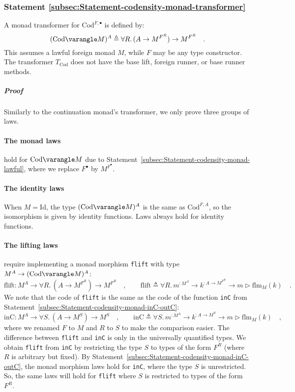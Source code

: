 \subsubsection{Statement \label{subsec:Statement-codensity-monad-transformer}\ref{subsec:Statement-codensity-monad-transformer}}

A monad transformer for $\text{Cod}^{F,\bullet}$ is defined by:
\[
(\text{Cod}\varangle M)^{A}\triangleq\forall R.\,(A\rightarrow M^{F^{R}})\rightarrow M^{F^{R}}\quad.
\]
This assumes a lawful foreign monad $M$, while $F$ may be any type
constructor. The transformer $T_{\text{Cod}}$ does not have the base
lift, foreign runner, or base runner methods.

\subparagraph{Proof }

Similarly to the continuation monad\textsf{'}s transformer, we only prove three
groups of laws.

\paragraph{The monad laws}

hold for $\text{Cod}\varangle M$ due to Statement~\ref{subsec:Statement-codensity-monad-lawful},
where we replace $F^{\bullet}$ by $M^{F^{\bullet}}$.

\paragraph{The identity laws}

When $M=\text{Id}$, the type $(\text{Cod}\varangle M)^{A}$ is the
same as $\text{Cod}^{F,A}$, so the isomorphism is given by identity
functions. Laws always hold for identity functions.

\paragraph{The lifting laws}

require implementing a monad morphism \lstinline!flift! with type
$M^{A}\rightarrow(\text{Cod}\varangle M)^{A}$:
\[
\text{flift}:M^{A}\rightarrow\forall R.\,(A\rightarrow M^{F^{R}})\rightarrow M^{F^{R}}\quad,\quad\quad\text{flift}\triangleq\forall R.\,m^{:M^{A}}\rightarrow k^{:A\rightarrow M^{F^{R}}}\rightarrow m\triangleright\text{flm}_{M}(k)\quad.
\]
We note that the code of \lstinline!flift! is the same as the code
of the function \lstinline!inC! from Statement~\ref{subsec:Statement-codensity-monad-inC-outC}:
\[
\text{inC}:M^{A}\rightarrow\forall S.\,(A\rightarrow M^{S})\rightarrow M^{S}\quad,\quad\quad\text{inC}\triangleq\forall S.\,m^{:M^{A}}\rightarrow k^{:A\rightarrow M^{S}}\rightarrow m\triangleright\text{flm}_{M}(k)\quad,
\]
where we renamed $F$ to $M$ and $R$ to $S$ to make the comparison
easier. The difference between \lstinline!flift! and \lstinline!inC!
is only in the universally quantified types. We obtain \lstinline!flift!
from \lstinline!inC! by restricting the type $S$ to types of the
form $F^{R}$ (where $R$ is arbitrary but fixed). By Statement~\ref{subsec:Statement-codensity-monad-inC-outC},
the monad morphism laws hold for \lstinline!inC!, where the type
$S$ is unrestricted. So, the same laws will hold for \lstinline!flift!
where $S$ is restricted to types of the form $F^{R}$.

